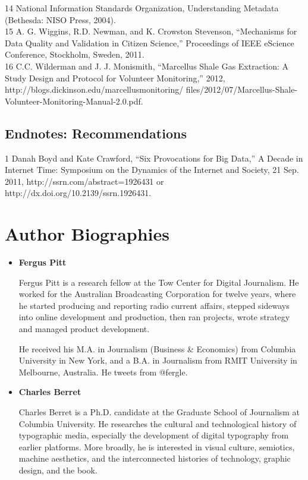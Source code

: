 \begin{itemize}
\begin{itemized}
\begin{itemize}
14 National Information Standards Organization, Understanding Metadata
(Bethesda: NISO Press, 2004).\\
15 A. G. Wiggins, R.D. Newman, and K. Crowston Stevenson, ``Mechanisms for Data Quality and
Validation in Citizen Science,'' Proceedings of IEEE eScience Conference, Stockholm, Sweden, 2011.\\
16 C.C. Wilderman and J. J. Monismith, ``Marcellus Shale Gas Extraction: A Study Design and
Protocol for Volunteer Monitoring,'' 2012, http://blogs.dickinson.edu/marcellusmonitoring/
files/2012/07/Marcellus-Shale-Volunteer-Monitoring-Manual-2.0.pdf.\\

\section{Endnotes: Recommendations}
1 Danah Boyd and Kate Crawford, ``Six Provocations for Big Data,'' A Decade in Internet Time: Symposium on the Dynamics of the Internet and Society, 21 Sep. 2011,
http://ssrn.com/abstract=1926431 or http://dx.doi.org/10.2139/ssrn.1926431.\\


\chapter{Author Biographies}

\begin{itemize}
\item \textbf{Fergus Pitt}

Fergus Pitt is a research fellow at the Tow Center for Digital Journalism.
He worked for the Australian Broadcasting Corporation for twelve years,
where he started producing and reporting radio current affairs, stepped
sideways into online development and production, then ran projects, wrote
strategy and managed product development.

He received his M.A. in Journalism (Business & Economics) from Columbia
University in New York, and a B.A. in Journalism from RMIT University in
Melbourne, Australia.
He tweets from @fergle.


\item \textbf{Charles Berret}

Charles Berret is a Ph.D. candidate at the Graduate School of Journalism
at Columbia University. He researches the cultural and technological history
of typographic media, especially the development of digital typography
from earlier platforms. More broadly, he is interested in visual culture,
semiotics, machine aesthetics, and the interconnected histories of technology,
graphic design, and the book.



\end{itemize}
\end{itemize}
\end{itemized}
\end{itemize}
